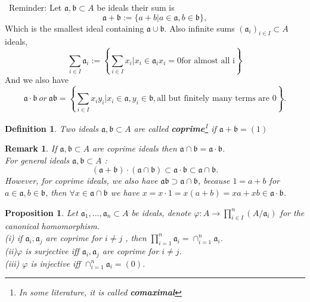 \documentclass[11pt]{article}
\newtheorem{prop}[thm]{Proposition}
\newtheorem{dfn}[thm]{Definition}
\newtheorem{rmk}[thm]{Remark}
\newcommand{\sca}{{\mathfrak a}}
\newcommand{\scb}{{\mathfrak b}}
\begin{document}
 Reminder: Let $\sca,\scb \subset A$ be ideals their sum is 
$$
\sca+\scb:=\{a+b|a\in \sca, b\in \scb\},
$$
Which is the smallest ideal containing $\sca\cup\scb$.
Also infinite sums $(\sca_i)_{i\in I}\subset A$ ideals,
$$
\sum_{i\in I }\sca_i :=\left\{\sum_{i\in I}x_i | x_i\in \sca_i  x_i =0 \text{for almost all i}\right\}
$$
And we also have
$$
\sca\cdot \scb\ or\ \sca\scb=\left\{\sum_{i\in I}x_i y_i|x_i \in \sca , y_i\in \scb, \text{all but finitely many terms are }0\right\}.
$$
\begin{dfn}
Two ideals $\sca, \scb\subset A$ are called \textbf{coprime}\footnote{In some literature, it is called \textbf{comaximal}} if $\sca+\scb=(1)$ 
\end{dfn}
\begin{rmk}
If $\sca,\scb\subset A$ are coprime ideals then $\sca\cap \scb =\sca\cdot \scb$.\\
For general ideals $\sca,\scb\subset A$ :
$$
(\sca+\scb)\cdot(\sca\cap \scb)\subset \sca\cdot \scb\subset \sca\cap \scb.
$$
However, for coprime ideals, we also have $\sca\scb \supset \sca\cap\scb$, because $1=a+b$ for $a\in\sca, b\in \scb$, then
$\forall x\in \sca\cap\scb$ we have $x=x\cdot 1=x(a+b)=xa+xb\in \sca\cdot \scb$.
\end{rmk}

\begin{prop}
Let $\sca_1,...,\sca_n \subset A$ be ideals, denote $\varphi: A\rightarrow \prod_{i\in I}^n(A/\sca_{i})$ for the canonical homomorphism.\\
(i) if $\sca_i,\sca_j$ are coprime for $i\neq j$ , then $\prod_{i=1}^n\sca_i=\cap_{i=1}^n\sca_i$.\\
(ii)$\varphi$ is surjective iff $\sca_i,\sca_j$ are coprime for $i\neq  j$.\\
(iii) $\varphi$ is injective iff $\cap_{i=1}^n\sca_i=(0)$.
\end{prop}
\end{document}
